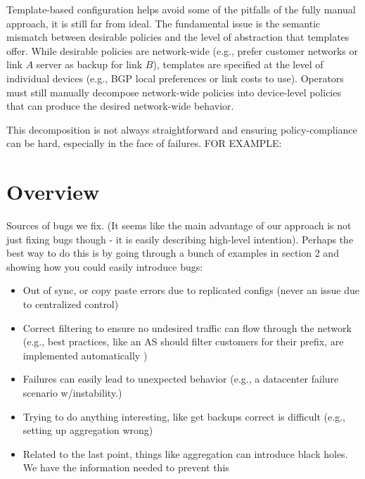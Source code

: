 \documentclass{paper}
\begin{document}

Template-based configuration helps avoid some of the pitfalls of the fully manual approach, it is still far from ideal. The fundamental issue is the semantic mismatch between desirable policies and the level of abstraction that templates offer. While desirable policies are network-wide (e.g., prefer customer networks or link $A$ server as backup for link $B$), templates are specified at the level of individual devices (e.g., BGP local preferences or link costs to use). Operators must still manually decompose network-wide policies into device-level policies that can produce the desired network-wide behavior.

This decomposition is not always straightforward and ensuring policy-compliance can be hard, especially in the face of failures. FOR EXAMPLE:



\section{Overview}

Sources of bugs we fix. (It seems like the main advantage of our approach is not just fixing bugs though - it is easily describing high-level intention).
Perhaps the best way to do this is by going through a bunch of examples in section 2 and showing how you could easily introduce bugs:

\begin{itemize}
	\item Out of sync, or copy paste errors due to replicated configs (never an issue due to centralized control)
	\item Correct filtering to ensure no undesired traffic can flow through the network (e.g., best practices, like an AS should filter customers for their prefix, are implemented automatically )
	\item Failures can easily lead to unexpected behavior (e.g., a datacenter failure scenario w/instability.)
	\item Trying to do anything interesting, like get backups correct is difficult (e.g., setting up aggregation wrong)
	\item Related to the last point, things like aggregation can introduce black holes. We have the information needed to prevent this
\end{itemize}
\end{document}
